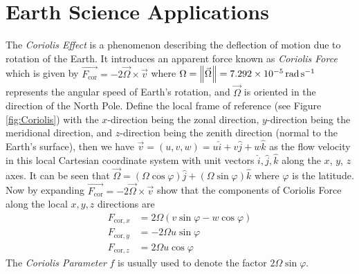 \section{Earth Science Applications}
\begin{exmp}
\label{exmp:Coriolis}
The \textit{Coriolis Effect} is a phenomenon describing the deflection of motion due to rotation of the Earth. It introduces an apparent force known as \textit{Coriolis Force} which is given by $\overrightarrow{F_\text{cor}} = -2\vec{\Omega} \times \vec{v}$ where $\Omega = \norm{\vec{\Omega}} = \SI{7.292e-5}{\radian \per \s}$ represents the angular speed of Earth's rotation, and $\vec{\Omega}$ is oriented in the direction of the North Pole. Define the local frame of reference (see Figure \ref{fig:Coriolis}) with the $x$-direction being the zonal direction, $y$-direction being the meridional direction, and $z$-direction being the zenith direction (normal to the Earth's surface), then we have $\vec{v} = (u,v,w) = u\hat{i} + v\hat{j} + w\hat{k}$ as the flow velocity in this local Cartesian coordinate system with unit vectors $\hat{i}, \hat{j}, \hat{k}$ along the $x$, $y$, $z$ axes. It can be seen that $\vec{\Omega} = (\Omega \cos\varphi) \hat{j} + (\Omega \sin \varphi) \hat{k}$ where $\varphi$ is the latitude. Now by expanding $\overrightarrow{F_\text{cor}} = -2\vec{\Omega} \times \vec{v}$ show that the components of Coriolis Force along the local $x,y,z$ directions are
\begin{align*}
F_{\text{cor},x} &= 2\Omega (v\sin\varphi - w\cos\varphi) \\
F_{\text{cor},y} &= -2\Omega u \sin\varphi \\
F_{\text{cor},z} &= 2\Omega u \cos\varphi
\end{align*}
The \textit{Coriolis Parameter} $f$ is usually used to denote the factor $2\Omega\sin\varphi$.
\end{exmp}
